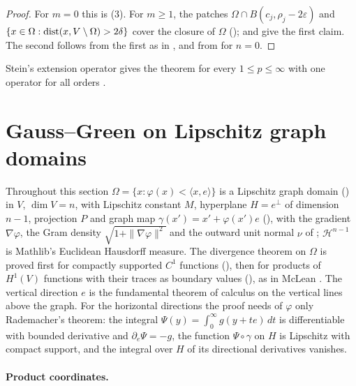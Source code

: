 \begin{proof}
\leanok
For $m = 0$ this is  (3). For $m \geq 1$, the patches
$\Omega \cap B(c_j, \rho_j - 2\varepsilon)$ and
$\{x \in \Omega : \operatorname{dist}(x, V \setminus \Omega) > 2\delta\}$ cover the closure of $\Omega$
();  and
 give the first claim. The second follows from the first as in
, and from  for $n = 0$.
\end{proof}

Stein's extension operator gives the theorem for every $1 \leq p \leq \infty$ with one operator
for all orders \cite[Chapter VI, \S 3, Theorem 5]{SteinSingular}.

\section{Gauss--Green on Lipschitz graph domains}
\label{sec:lipschitz-graph-green}

Throughout this section $\Omega = \{x : \varphi(x) < \langle x, e \rangle\}$ is a Lipschitz graph
domain () in $V$, $\dim V = n$, with Lipschitz constant $M$, hyperplane
$H = e^\perp$ of dimension $n - 1$, projection $P$ and graph map $\gamma(x') = x' + \varphi(x') e$
(), with the gradient $\nabla\varphi$, the Gram density
$\sqrt{1 + \|\nabla\varphi\|^2}$ and the outward unit normal $\nu$ of
; $\mathcal H^{n-1}$ is Mathlib's Euclidean Hausdorff measure. The
divergence theorem on $\Omega$ is proved
first for compactly supported $C^1$ functions (), then for products
of $H^1(V)$ functions with their traces as boundary values (), as in McLean
\cite[Chapter 3]{McLean}. The vertical direction $e$ is the fundamental theorem of calculus on the
vertical lines above the graph. For the horizontal directions the proof needs of $\varphi$ only
Rademacher's theorem: the integral $\Psi(y) = \int_0^\infty g(y + t e) \, dt$ is
differentiable with bounded derivative and $\partial_e \Psi = -g$, the function
$\Psi \circ \gamma$ on $H$ is Lipschitz with compact support, and the integral over $H$ of its
directional derivatives vanishes.

\paragraph{Product coordinates.}

